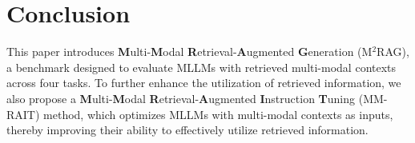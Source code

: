 \section{Conclusion}
This paper introduces \textbf{M}ulti-\textbf{M}odal \textbf{R}etrieval-\textbf{A}ugmented \textbf{G}eneration (M$^2$RAG), a benchmark designed to evaluate MLLMs with retrieved multi-modal contexts across four tasks. To further enhance the utilization of retrieved information, we also propose a \textbf{M}ulti-\textbf{M}odal \textbf{R}etrieval-\textbf{A}ugmented \textbf{I}nstruction \textbf{T}uning (MM-RAIT) method, which optimizes MLLMs with multi-modal contexts as inputs, thereby improving their ability to effectively utilize retrieved information.

